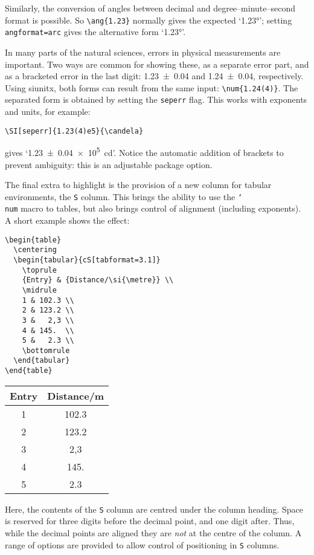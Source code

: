 \documentclass{article}
\providecommand*\cs[1]{\texttt{\char`\\#1}}
\providecommand*\pkg[1]{\textsf{#1}}
\providecommand*\opt[1]{\texttt{#1}}
\begin{document}
Similarly, the conversion of angles between decimal and
degree--minute--second format is possible.  So
\verb|\ang{1.23}| normally gives the expected `\ang{1.23}';
setting \opt{angformat=arc} gives the alternative form
`\ang[angformat=arc]{1.23}'.

In many parts of the natural sciences, errors in physical
measurements are important.  Two ways are common for showing
these, as a separate error part, and as a bracketed error in
the last digit: \num[seperr]{1.23(4)} and \num{1.24(4)},
respectively.  Using \pkg{siunitx}, both forms can result from
the same input: \verb|\num{1.24(4)}|.  The separated form is
obtained by setting the \opt{seperr} flag.  This works with
exponents and units, for example:
\begin{verbatim}
\SI[seperr]{1.23(4)e5}{\candela}
\end{verbatim}
gives `\SI[seperr]{1.23(4)e5}{\candela}'.  Notice the
automatic addition of brackets to prevent ambiguity: this is an
adjustable package option.

The final extra to highlight is the provision of a new column
for tabular environments, the \texttt{S} column.  This brings
the ability to use the \cs{num} macro to tables, but also
brings control of alignment (including exponents).  A short
example shows the effect:
\begin{verbatim}
\begin{table}
  \centering
  \begin{tabular}{cS[tabformat=3.1]}
    \toprule
    {Entry} & {Distance/\si{\metre}} \\
    \midrule
    1 & 102.3 \\
    2 & 123.2 \\
    3 &   2,3 \\
    4 & 145.  \\
    5 &   2.3 \\
    \bottomrule
  \end{tabular}
\end{table}
\end{verbatim}
\begin{table}
  \centering
  \begin{tabular}{cS[tabformat=3.1]}
    \toprule
    {Entry} & {Distance/\si{\metre}} \\
     & 102.3 \\
    2 & 123.2 \\
    3 &   2,3 \\
    4 & 145.  \\
    5 &   2.3 \\
    \bottomrule
  \end{tabular}
\end{table}
Here, the contents of the \texttt{S} column are centred under
the column heading.  Space is reserved for three digits before
the decimal point, and one digit after.  Thus, while the
decimal points are aligned they are \emph{not} at the centre of
the column.  A range of options are provided to allow control
of positioning in \texttt{S} columns.
\end{document}
